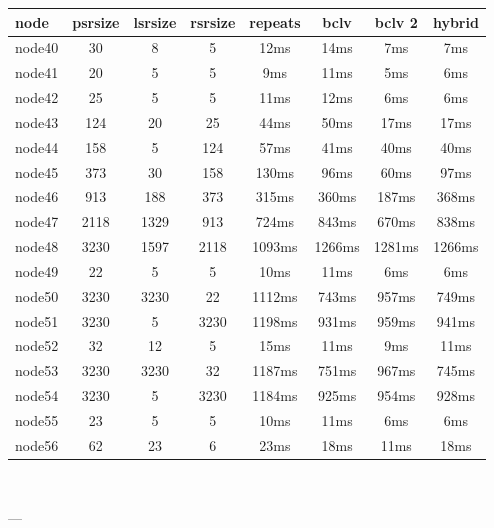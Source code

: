 \begin{tabular}{|l|c|c|c|c|c|c|c|}
\hline node & psrsize & lsrsize & rsrsize   & repeats & bclv & bclv 2 & hybrid\\
    \hline node40 & 30 & 8 & 5 & 12ms & 14ms & 7ms & 7ms\\
    \hline node41 & 20 & 5 & 5 & 9ms & 11ms & 5ms & 6ms\\
    \hline node42 & 25 & 5 & 5 & 11ms & 12ms & 6ms & 6ms\\
    \hline node43 & 124 & 20 & 25 & 44ms & 50ms & 17ms & 17ms\\
    \hline node44 & 158 & 5 & 124 & 57ms & 41ms & 40ms & 40ms\\
    \hline node45 & 373 & 30 & 158 & 130ms & 96ms & 60ms & 97ms\\
    \hline node46 & 913 & 188 & 373 & 315ms & 360ms & 187ms & 368ms\\
    \hline node47 & 2118 & 1329 & 913 & 724ms & 843ms & 670ms & 838ms\\
    \hline node48 & 3230 & 1597 & 2118 & 1093ms & 1266ms & 1281ms & 1266ms\\
    \hline node49 & 22 & 5 & 5 & 10ms & 11ms & 6ms & 6ms\\
    \hline node50 & 3230 & 3230 & 22 & 1112ms & 743ms & 957ms & 749ms\\
    \hline node51 & 3230 & 5 & 3230 & 1198ms & 931ms & 959ms & 941ms\\
    \hline node52 & 32 & 12 & 5 & 15ms & 11ms & 9ms & 11ms\\
    \hline node53 & 3230 & 3230 & 32 & 1187ms & 751ms & 967ms & 745ms\\
    \hline node54 & 3230 & 5 & 3230 & 1184ms & 925ms & 954ms & 928ms\\
    \hline node55 & 23 & 5 & 5 & 10ms & 11ms & 6ms & 6ms\\
    \hline node56 & 62 & 23 & 6 & 23ms & 18ms & 11ms & 18ms\\

\hline
\end{tabular} \

---

